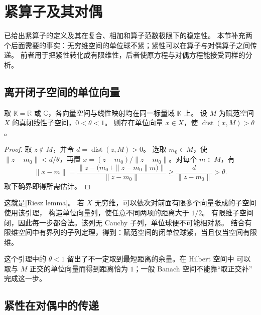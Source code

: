 \section{紧算子及其对偶}
\label{b1:sec:C102}

已给出紧算子的定义及其在复合、相加和算子范数极限下的稳定性。
本节补充两个后面需要的事实：无穷维空间的单位球不紧；紧性可以在算子与对偶算子之间传递。
前者用于把紧性转化成有限维性，后者使原方程与对偶方程能接受同样的分析。

\subsection{离开闭子空间的单位向量}
\label{b1:subsec:C10201}

\begin{lemma}[Riesz]\label{b1:lem:C1-riesz}
取 \(\mathbb K=\mathbb R\) 或 \(\mathbb C\)，各向量空间与线性映射均在同一标量域 \(\mathbb K\) 上。
设 \(M\) 为赋范空间 \(X\) 的真闭线性子空间，\(0<\theta<1\)。
则存在单位向量 \(x\in X\)，使 \(\operatorname{dist}(x,M)>\theta\)。
\end{lemma}
\begin{proof}
取 \(z\notin M\)，并令 \(d=\operatorname{dist}(z,M)>0\)。
选取 \(m_0\in M\)，使 \(\|z-m_0\|<d/\theta\)，再置
\(x=(z-m_0)/\|z-m_0\|\)。对每个 \(m\in M\)，有
\[
 \|x-m\|
 =\frac{\bigl\|z-\bigl(m_0+\|z-m_0\|m\bigr)\bigr\|}{\|z-m_0\|}
 \geq\frac d{\|z-m_0\|}>\theta.
\]
取下确界即得所需估计。
\end{proof}

这就是[Riesz lemma]。
若 \(X\) 无穷维，可以依次对前面有限多个向量张成的子空间使用该引理，
构造单位向量列，使任意不同两项的距离大于 \(1/2\)。
有限维子空间闭，因此每一步都合法。该列无 Cauchy 子列，单位球便不可能相对紧。
结合有限维空间中有界列的子列定理，得到：赋范空间的闭单位球紧，当且仅当空间有限维。


\ProseParagraphBreak

这个引理中的 \(\theta<1\) 留出了不一定取到最短距离的余量。在 Hilbert 空间中
可以取与 \(M\) 正交的单位向量而得到距离恰为 \(1\)；一般 Banach 空间不能靠“取正交补”
完成这一步。

\subsection{紧性在对偶中的传递}
\label{b1:subsec:C10202}

